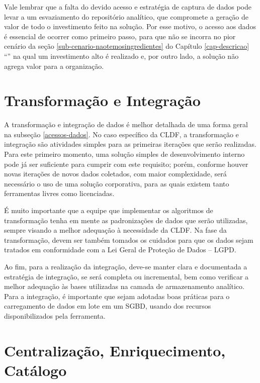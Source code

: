 Vale lembrar que a falta do devido acesso e estratégia de captura de dados pode levar a um esvaziamento do repositório analítico, que compromete a geração de valor de todo o investimento feito na solução. Por esse motivo, o acesso aos dados é essencial de ocorrer como primeiro passo, para que não se incorra no pior cenário da seção \ref{sub-cenario-naotemosingredientes} do Capítulo \ref{cap-descricao} ``'' na qual um investimento alto é realizado e, por outro lado, a solução não agrega valor para a organização.


\section{Transformação e Integração}

A transformação e integração de dados é melhor detalhada de uma forma geral na subseção \ref{acessos-dados}. No caso específico da CLDF, a transformação e integração são atividades simples para as primeiras iterações que serão realizadas. Para este primeiro momento, uma solução simples de desenvolvimento interno pode já ser suficiente para cumprir com este requisito; porém, conforme houver novas iterações de novos dados coletados, com maior complexidade, será necessário o uso de uma solução corporativa, para as quais existem tanto ferramentas livres como licenciadas.

É muito importante que a equipe que implementar os algoritmos de transformação tenha em mente as padronizações de dados que serão utilizadas, sempre visando a melhor adequação à necessidade da CLDF. Na fase da transformação, devem ser também tomados os cuidados para que os dados sejam tratados em conformidade com a Lei Geral de Proteção de Dados -- LGPD.

Ao fim, para a realização da integração, deve-se manter clara e documentada a estratégia de integração, se será completa ou incremental, bem como verificar a melhor adequação às bases utilizadas na camada de armazenamento analítico. Para a integração, é importante que sejam adotadas boas práticas para o carregamento de dados em lote em um SGBD, usando dos recursos disponibilizados pela ferramenta.

\section{Centralização, Enriquecimento, Catálogo}

